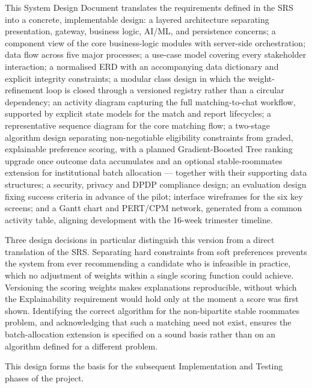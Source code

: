 \documentclass[12pt,a4paper]{report}
\begin{document}
This System Design Document translates the requirements defined in the SRS into a concrete, implementable design: a layered architecture separating presentation, gateway, business logic, AI/ML, and persistence concerns; a component view of the core business-logic modules with server-side orchestration; data flow across five major processes; a use-case model covering every stakeholder interaction; a normalised ERD with an accompanying data dictionary and explicit integrity constraints; a modular class design in which the weight-refinement loop is closed through a versioned registry rather than a circular dependency; an activity diagram capturing the full matching-to-chat workflow, supported by explicit state models for the match and report lifecycles; a representative sequence diagram for the core matching flow; a two-stage algorithm design separating non-negotiable eligibility constraints from graded, explainable preference scoring, with a planned Gradient-Boosted Tree ranking upgrade once outcome data accumulates and an optional stable-roommates extension for institutional batch allocation --- together with their supporting data structures; a security, privacy and DPDP compliance design; an evaluation design fixing success criteria in advance of the pilot; interface wireframes for the six key screens; and a Gantt chart and PERT/CPM network, generated from a common activity table, aligning development with the 16-week trimester timeline.

Three design decisions in particular distinguish this version from a direct translation of the SRS. Separating hard constraints from soft preferences prevents the system from ever recommending a candidate who is infeasible in practice, which no adjustment of weights within a single scoring function could achieve. Versioning the scoring weights makes explanations reproducible, without which the Explainability requirement would hold only at the moment a score was first shown. Identifying the correct algorithm for the non-bipartite stable roommates problem, and acknowledging that such a matching need not exist, ensures the batch-allocation extension is specified on a sound basis rather than on an algorithm defined for a different problem.

This design forms the basis for the subsequent Implementation and Testing phases of the project.

\vspace{2em}
\end{document}
